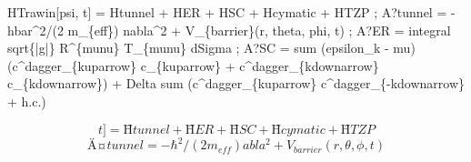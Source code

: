 
\begin{tzpsnapshot}
\end{tzpsnapshot}

HTrawin[psi, t] = Htunnel + HER + HSC + Hcymatic + HTZP ; A?tunnel = -hbar\textasciicircum{}2/(2 m\_\{eff\}) nabla\textasciicircum{}2 + V\_\{barrier\}(r, theta, phi, t) ; A?ER = integral sqrt\{|g|\} R\textasciicircum{}\{munu\} T\_\{munu\} dSigma ; A?SC = sum (epsilon\_k - mu)(c\textasciicircum{}dagger\_\{kuparrow\} c\_\{kuparrow\} + c\textasciicircum{}dagger\_\{kdownarrow\} c\_\{kdownarrow\}) + Delta sum (c\textasciicircum{}dagger\_\{kuparrow\} c\textasciicircum{}dagger\_\{-kdownarrow\} + h.c.)

\[
t] = Ĥtunnel + ĤER + ĤSC + Ĥcymatic + ĤTZP
\]
\[
Ä¤tunnel = -\hbar^2/(2 m_{eff})  abla^2 + V_{barrier}(r, \theta, \phi, t)
\]

